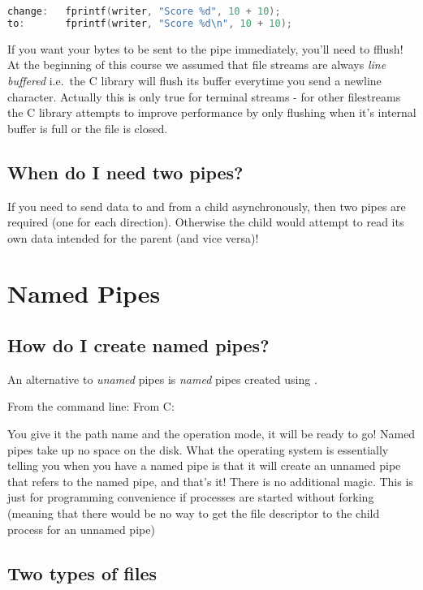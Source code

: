 \begin{lstlisting}[language=C]
change:   fprintf(writer, "Score %d", 10 + 10);
to:       fprintf(writer, "Score %d\n", 10 + 10);
\end{lstlisting}

If you want your bytes to be sent to the pipe immediately, you'll need to fflush! At the beginning of this course we assumed that file streams are always \emph{line buffered} i.e.~the C library will flush its buffer everytime you send a newline character. Actually this is only true for terminal streams - for other filestreams the C library attempts to improve performance by only flushing when it's internal buffer is full or the file is closed.

\subsection{When do I need two pipes?}

If you need to send data to and from a child asynchronously, then two pipes are required (one for each direction). Otherwise the child would attempt to read its own data intended for the parent (and vice versa)!

\section{Named Pipes}\label{named-pipes}

\subsection{How do I create named pipes?}\label{how-do-i-create-named-pipes}

An alternative to \emph{unamed} pipes is \emph{named} pipes created using .

From the command line:  From C: 

You give it the path name and the operation mode, it will be ready to go! Named pipes take up no space on the disk. What the operating system is essentially telling you when you have a named pipe is that it will create an unnamed pipe that refers to the named pipe, and that's it! There is no additional magic. This is just for programming convenience if processes are started without forking (meaning that there would be no way to get the file descriptor to the child process for an unnamed pipe)


\subsection{Two types of files}

